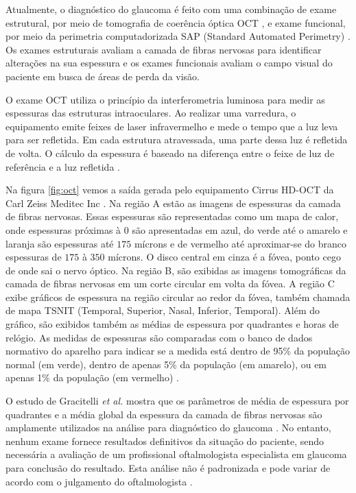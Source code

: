 \documentclass[conference]{IEEEtran}
\begin{document}

Atualmente, o diagnóstico do glaucoma é feito com uma combinação de exame estrutural, por meio de tomografia de coerência óptica OCT \cite{Wollstein2005}, e exame funcional, por meio da perimetria computadorizada SAP (Standard Automated Perimetry) \cite{chauhan1990}. Os exames estruturais avaliam a camada de fibras nervosas para identificar alterações na sua espessura e os exames funcionais avaliam o campo visual do paciente em busca de áreas de perda da visão. 

O exame OCT utiliza o princípio da interferometria luminosa para medir as espessuras das estruturas intraoculares. Ao realizar uma varredura, o equipamento emite feixes de laser infravermelho e mede o tempo que a luz leva para ser refletida. Em cada estrutura atravessada, uma parte dessa luz é refletida de volta. O cálculo da espessura é baseado na diferença entre o feixe de luz de referência e a luz refletida \cite{huang1991}. 

Na figura \ref{fig:oct} vemos a saída gerada pelo equipamento Cirrus HD-OCT da Carl Zeiss Meditec Inc \cite{zeiss}. Na região A estão as imagens de espessuras da camada de fibras nervosas. Essas espessuras são representadas como um mapa de calor, onde espessuras próximas à $0$ são apresentadas em azul, do verde até o amarelo e laranja são espessuras até $175$ mícrons e de vermelho até aproximar-se do branco espessuras de $175$ à $350$ mícrons. O disco central em cinza é a fóvea, ponto cego de onde sai o nervo óptico. Na região B, são exibidas as imagens tomográficas da camada de fibras nervosas em um corte circular em volta da fóvea. A região C exibe gráficos de espessura na região circular ao redor da fóvea, também chamada de mapa TSNIT (Temporal, Superior, Nasal, Inferior, Temporal). Além do gráfico, são exibidos também as médias de espessura por quadrantes e horas de relógio. As medidas de espessuras são comparadas com o banco de dados normativo do aparelho para indicar se a medida está dentro de 95\% da população normal (em verde), dentro de apenas 5\% da população (em amarelo), ou em apenas 1\% da população (em vermelho) \cite{aref2010}. 

O estudo de Gracitelli \textit{et al.} mostra que os parâmetros de média de espessura por quadrantes e a média global da espessura da camada de fibras nervosas são amplamente utilizados na análise para diagnóstico do glaucoma \cite{Gracitelli2015}. No entanto, nenhum exame fornece resultados definitivos da situação do paciente, sendo necessária a avaliação de um profissional oftalmologista especialista em glaucoma para conclusão do resultado. Esta análise não é padronizada e pode variar de acordo com o julgamento do oftalmologista \cite{kroese2003}. 
\end{document}
